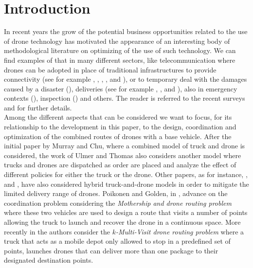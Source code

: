 \section{Introduction}
In recent years the grow of the potential business opportunities related to the use of drone technology has motivated the appearance of an interesting body of methodological literature on optimizing of the use of such technology. 
We can find examples of that in many different sectors, like telecommunication where drones can be adopted in place of traditional infrastructures to provide connectivity (see for example \cite{art:Amorosi2018}, \cite{art:Chiaraviglio2018}, \cite{Jimenez2018}, \cite{art:Amorosi2019}, and \cite{art:Chiaraviglio2019a}), or to temporary deal with the damages caused by a disaster (\cite{art:Chiaraviglio2019}), deliveries (see for example \cite{art:Mathew2015} , \cite{art:Ferrandez2016}, \cite{art:Poikonen2020} and \cite{art:Amorosi2020}), also in emergency contexts (\cite{art:Wen2016}), inspection (\cite{art:Trotta2018}) and others.
The reader is referred to the recent surveys \cite{art:Otto2018} and \cite{art:Chung2020} for further details.\\
\noindent
Among the different aspects that can be considered we want to focus, for its relationship to the development in this paper, to the design, coordination and optimization of the combined routes of drones with a base vehicle. After the initial paper \cite{MURRAY201586} by Murray and Chu, where a combined model of truck and drone is considered, the work of Ulmer and Thomas \cite{Ulmer2018} also considers another model where trucks and drones are dispatched as order are placed and analyze the effect of different policies for either the truck or the drone. Other papers, as for instance, \cite{art:Campbell2017}, \cite{art:Carlsson2017} and \cite{art:Dayarian2017}, have also considered hybrid truck-and-drone models in order to mitigate the limited delivery range of drones. Poikonen and Golden, in \cite{Poikonen2019}, advance on the coordination problem considering the \textit{Mothership and drone routing problem} where these two vehicles are used to design a route that visits a number of points allowing the truck to launch and recover the drone in a continuous space. More recently in \cite{art:Poikonen2020} the authors consider the \textit{$k$-Multi-Visit drone routing problem} where a truck that acts as a mobile depot only allowed to stop in a predefined set of points, launches drones that can deliver more than one package to their designated destination points.
\noindent

